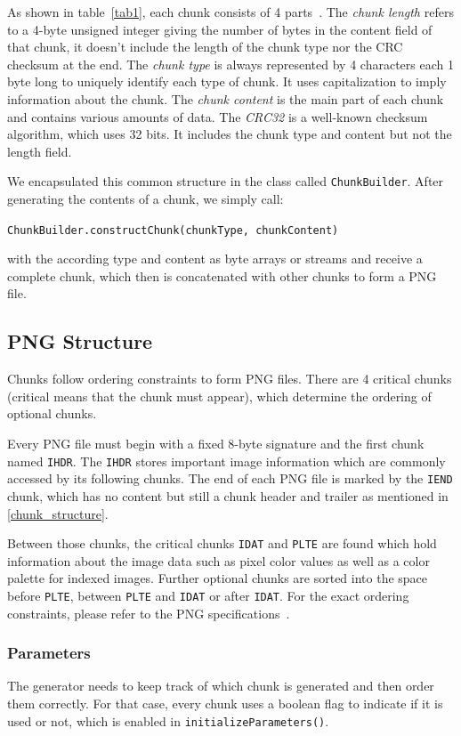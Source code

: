 \documentclass[runningheads]{llncs}
\begin{document}
As shown in table~\ref{tab1}, each chunk consists of 4 parts~\cite{libpng_file_structure}. 
The \textit{chunk length} refers to a 4-byte unsigned integer giving the number of bytes in the content field of that chunk, it doesn't include the length of the chunk type nor the CRC checksum at the end.
The \textit{chunk type} is always represented by 4 characters each 1 byte long to uniquely identify each type of chunk. It uses capitalization to imply information about the chunk.
The \textit{chunk content} is the main part of each chunk and contains various amounts of data.
The \textit{CRC32} is a well-known checksum algorithm, which uses 32 bits. It includes the chunk type and content but not the length field.

We encapsulated this common structure in the class called \texttt{ChunkBuilder}. After generating the contents of a chunk, we simply call: 
\begin{center}
\texttt{ChunkBuilder.constructChunk(chunkType, chunkContent)} 
\end{center}
with the according type and content as byte arrays or streams and receive a complete chunk, which then is concatenated with other chunks to form a PNG file. 

\subsection{PNG Structure}
Chunks follow ordering constraints to form PNG files. There are 4 critical chunks (critical means that the chunk must appear), which determine the ordering of optional chunks. 

Every PNG file must begin with a fixed 8-byte signature and the first chunk named \texttt{IHDR}. The \texttt{IHDR} stores important image information which are commonly accessed by its following chunks.
The end of each PNG file is marked by the \texttt{IEND} chunk, which has no content but still a chunk header and trailer as mentioned in \ref{chunk_structure}.

Between those chunks, the critical chunks \texttt{IDAT} and \texttt{PLTE} are found which hold information about the image data such as pixel color values as well as a color palette for indexed images. 
Further optional chunks are sorted into the space before \texttt{PLTE}, between \texttt{PLTE} and \texttt{IDAT} or after \texttt{IDAT}. 
For the exact ordering constraints, please refer to the PNG specifications~\cite{libpng_chunks}.
\subsubsection{Parameters}
The generator needs to keep track of which chunk is generated and then order them correctly. For that case, every chunk uses a boolean flag to indicate if it is used or not, which is enabled in \texttt{initializeParameters()}.
\end{document}

